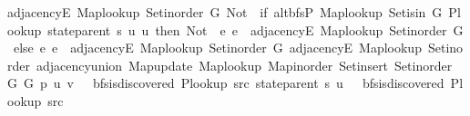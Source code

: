 \begin{isabellebody}
adjacency{\isachardot}{\kern0pt}E\ {\isacharquery}{\kern0pt}Map{\isacharunderscore}{\kern0pt}lookup\ {\isacharquery}{\kern0pt}Set{\isacharunderscore}{\kern0pt}inorder\ {\isacharquery}{\kern0pt}G{}{\isachardot}{\kern0pt}{}{\isacharparenright}{\kern0pt}{\isacharparenright}{\kern0pt}\ {\isacharparenleft}{\kern0pt}Not\ {\isasymcirc}\ {\isacharparenleft}{\kern0pt}if\ alt{\isacharunderscore}{\kern0pt}bfs{\isachardot}{\kern0pt}P{\isacharprime}{\kern0pt}\ {\isacharquery}{\kern0pt}Map{\isacharunderscore}{\kern0pt}lookup\ {\isacharquery}{\kern0pt}Set{\isacharunderscore}{\kern0pt}isin\ {\isacharquery}{\kern0pt}G{}{\isachardot}{\kern0pt}{}\ {\isacharparenleft}{\kern0pt}{\isacharquery}{\kern0pt}P{\isacharunderscore}{\kern0pt}lookup\ {\isacharparenleft}{\kern0pt}state{\isachardot}{\kern0pt}parent\ {\isacharquery}{\kern0pt}s{\isacharparenright}{\kern0pt}\ {\isacharquery}{\kern0pt}u{\isacharparenright}{\kern0pt}\ {\isacharquery}{\kern0pt}u\ then\ Not\ {\isasymcirc}\ {\isacharparenleft}{\kern0pt}{\isasymlambda}e{\isachardot}{\kern0pt}\ e\ {\isasymin}\ adjacency{\isachardot}{\kern0pt}E\ {\isacharquery}{\kern0pt}Map{\isacharunderscore}{\kern0pt}lookup\ {\isacharquery}{\kern0pt}Set{\isacharunderscore}{\kern0pt}inorder\ {\isacharquery}{\kern0pt}G{}{\isachardot}{\kern0pt}{}{\isacharparenright}{\kern0pt}\ else\ {\isacharparenleft}{\kern0pt}{\isasymlambda}e{\isachardot}{\kern0pt}\ e\ {\isasymin}\ adjacency{\isachardot}{\kern0pt}E\ {\isacharquery}{\kern0pt}Map{\isacharunderscore}{\kern0pt}lookup\ {\isacharquery}{\kern0pt}Set{\isacharunderscore}{\kern0pt}inorder\ {\isacharquery}{\kern0pt}G{}{\isachardot}{\kern0pt}{}{\isacharparenright}{\kern0pt}{\isacharparenright}{\kern0pt}{\isacharparenright}{\kern0pt}\ {\isacharparenleft}{\kern0pt}adjacency{\isachardot}{\kern0pt}E\ {\isacharquery}{\kern0pt}Map{\isacharunderscore}{\kern0pt}lookup\ {\isacharquery}{\kern0pt}Set{\isacharunderscore}{\kern0pt}inorder\ {\isacharparenleft}{\kern0pt}adjacency{\isachardot}{\kern0pt}union\ {\isacharquery}{\kern0pt}Map{\isacharunderscore}{\kern0pt}update\ {\isacharquery}{\kern0pt}Map{\isacharunderscore}{\kern0pt}lookup\ {\isacharquery}{\kern0pt}Map{\isacharunderscore}{\kern0pt}inorder\ {\isacharquery}{\kern0pt}Set{\isacharunderscore}{\kern0pt}insert\ {\isacharquery}{\kern0pt}Set{\isacharunderscore}{\kern0pt}inorder\ {\isacharquery}{\kern0pt}G{}{\isachardot}{\kern0pt}{}\ {\isacharquery}{\kern0pt}G{}{\isachardot}{\kern0pt}{}{\isacharparenright}{\kern0pt}{\isacharparenright}{\kern0pt}\ {\isacharquery}{\kern0pt}p\ {\isacharquery}{\kern0pt}u\ {\isacharquery}{\kern0pt}v{\isacharsemicolon}{\kern0pt}\ {\isasymnot}\ {\isasymnot}\ bfs{\isachardot}{\kern0pt}is{\isacharunderscore}{\kern0pt}discovered\ {\isacharquery}{\kern0pt}P{\isacharunderscore}{\kern0pt}lookup\ {\isacharquery}{\kern0pt}src\ {\isacharparenleft}{\kern0pt}state{\isachardot}{\kern0pt}parent\ {\isacharquery}{\kern0pt}s{\isacharparenright}{\kern0pt}\ {\isacharquery}{\kern0pt}u{\isacharsemicolon}{\kern0pt}\ {\isasymnot}\ {\isasymnot}\ bfs{\isachardot}{\kern0pt}is{\isacharunderscore}{\kern0pt}discovered\ {\isacharquery}{\kern0pt}P{\isacharunderscore}{\kern0pt}lookup\ {\isacharquery}{\kern0pt}src\ 
\end{isabellebody}
